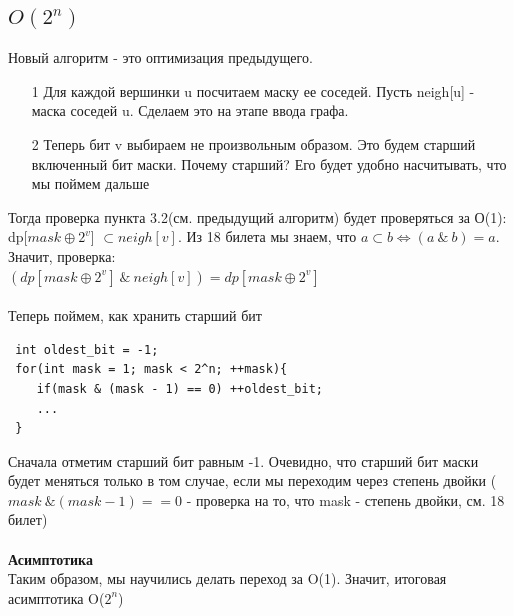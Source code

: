 \subsection*{$O(2^n)$}
Новый алгоритм - это оптимизация предыдущего. 
\begin{itemize}
    \item [1] Для каждой вершинки u посчитаем маску ее соседей. Пусть  neigh[u] - маска соседей u. Сделаем это на этапе ввода графа.
    \item[2]  Теперь бит v выбираем не произвольным образом. Это будем старший включенный бит маски. Почему старший? Его будет удобно насчитывать, что мы поймем дальше
    \end{itemize}
 Тогда проверка пункта 3.2(см. предыдущий алгоритм) будет проверяться за О(1): \\ dp[$mask \oplus 2^v$] $\subset neigh[v]$. Из 18 билета мы знаем, что $a \subset b \Longleftrightarrow (a \ \& \ b) = a$. Значит, проверка:\\$(dp[mask \oplus 2^v] \  \&  \ neigh[v]) = dp[mask \oplus 2^v]$
 \\
 \\
 Теперь поймем, как хранить старший бит
 \begin{lstlisting}
 int oldest_bit = -1;
 for(int mask = 1; mask < 2^n; ++mask){
    if(mask & (mask - 1) == 0) ++oldest_bit;
    ...
 }
 \end{lstlisting}
 Сначала отметим старший бит равным -1. Очевидно, что старший бит маски будет меняться только в том случае, если мы переходим через степень двойки ($mask \  \& (mask - 1) == 0$ - проверка на то, что mask - степень двойки, см. 18 билет)
 \\
 \\
 \textbf{Асимптотика}\\
 Таким образом, мы научились делать переход за O(1). Значит, итоговая асимптотика O($2^n$) 

 \setcounter{section}{20}
